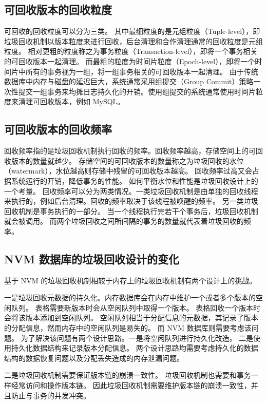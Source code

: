 \subsection{可回收版本的回收粒度}

可回收的回收粒度可以分为三类。
其中最细粒度的是元组粒度（Tuple-level），即垃圾回收机制以版本粒度来进行回收，后台清理和合作清理通常的回收粒度是元组粒度。
相对更粗的粒度称之为事务粒度（Transaction-level），即将一个事务相关的可回收版本一起清理。
而最粗的粒度为时间片粒度（Epoch-level），即将一个时间片中所有的事务视为一组，将一组事务相关的可回收版本一起清理。
由于传统数据库中内存与磁盘的延迟巨大，系统通常采用组提交（Group Commit）策略一次性提交一组事务来均摊日志持久化的开销。使用组提交的系统通常使用时间片粒度来清理可回收版本，例如 MySQL。

\subsection{可回收版本的回收频率}

回收频率指的是垃圾回收机制执行回收的频率。回收频率越高，存储空间上的可回收版本的数量就越少。
存储空间的可回收版本的数量称之为垃圾回收的水位（watermark），水位越高则存储中残留的可回收版本越高。
回收频率过高又会占据系统运行的开销，降低事务的性能。
如何平衡水位和性能是垃圾回收设计上的一个考量。
回收频率可以分为两类情况。一类垃圾回收机制是由单独的回收线程来执行的，例如后台清理。回收的频率取决于该线程被唤醒的频率。
另一类垃圾回收机制是事务执行的一部分。
当一个线程执行完若干个事务后，垃圾回收机制就会被调用。
而两个垃圾回收之间所间隔的事务的数量就代表着垃圾回收的频率。


\subsection{NVM 数据库的垃圾回收设计的变化}

基于 NVM 的垃圾回收机制相较于内存上的垃圾回收机制有两个设计上的挑战。

一是垃圾回收元数据的持久化。内存数据库会在内存中维护一个或者多个版本的空闲队列。
表格需要新版本时会从空闲队列中取得一个版本。
表格回收一个版本时会将该版本添加到空闲队列。
空闲队列相当于分配信息的元数据，其记录了版本的分配信息，然而内存中的空闲队列是易失的。
而 NVM 数据库则需要考虑该问题。
为了解决该问题有两个设计思路。一是将空闲队列进行持久化改造。
二是使用持久化数据结构来记录版本分配信息。
两个设计思路均需要考虑持久化的数据结构的数据恢复问题以及分配丢失造成的内存泄漏问题。

二是垃圾回收机制需要保证版本链的崩溃一致性。
垃圾回收机制也需要和事务一样经常访问和操作版本链。
因此垃圾回收机制需要维护版本链的崩溃一致性，并且防止与事务的并发冲突。

